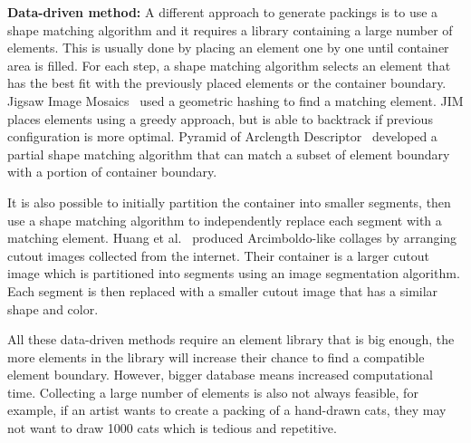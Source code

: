 \textbf{Data-driven method:} 
A different approach to generate packings is to use a shape matching algorithm
and it requires a library containing a large number of elements.
This is usually done by placing an element one by one until container area is filled.
For each step, a shape matching algorithm selects an 
element that has the best fit with the previously placed elements or the container boundary.
Jigsaw Image Mosaics~\cite{Kim2002} used a geometric hashing to find
a matching element. JIM places elements using a greedy approach, but is able to backtrack 
if previous configuration is more optimal.
Pyramid of Arclength Descriptor~\cite{Kwan2016} developed
a partial shape matching algorithm that can match a subset of element boundary with a portion
of container boundary.

It is also possible to initially partition the container into smaller segments,
then use a shape matching algorithm to independently replace each segment with a matching element.
Huang et al.~\cite{Huang2011} produced Arcimboldo-like collages
by arranging cutout images collected from the internet.
Their container is a larger cutout image which is partitioned into segments
using an image segmentation algorithm.
Each segment is then replaced with a smaller cutout image that has a similar shape and color.

All these data-driven methods require an element library that is big enough,
the more elements in the library will increase their chance to find a compatible element boundary.
However, bigger database means increased computational time.
Collecting a large number of elements is also not always feasible,
for example, if an artist wants to create a packing of a hand-drawn cats,
they may not want to draw 1000 cats which is tedious and repetitive.


